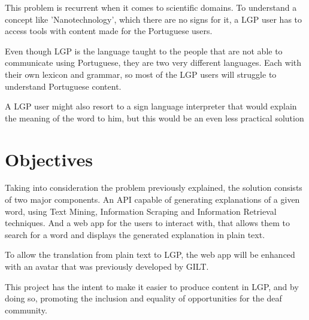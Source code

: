 This problem is recurrent when it comes to scientific domains.
To understand a concept like 'Nanotechnology', which there are no signs for it, a \gls{LGP} user has to access tools with content made for the Portuguese users.

Even though \gls{LGP} is the language taught to the people that are not able to communicate using Portuguese, they are two very different languages.
Each with their own lexicon and grammar, so most of the \gls{LGP} users will struggle to understand Portuguese content.

A \gls{LGP} user might also resort to a sign language interpreter that would explain the meaning of the word to him, but this would be an even less practical solution

\section{Objectives}

Taking into consideration the problem previously explained, the solution consists of two major components.
An \gls{API} capable of generating explanations of a given word, using Text Mining, Information Scraping and Information Retrieval techniques.
And a web app for the users to interact with, that allows them to search for a word and displays the generated explanation in plain text.

To allow the translation from plain text to \gls{LGP}, the web app will be enhanced with an avatar that was previously developed by \gls{GILT}.

This project has the intent to make it easier to produce content in \gls{LGP}, and by doing so, promoting the inclusion and equality of opportunities for the deaf community.
